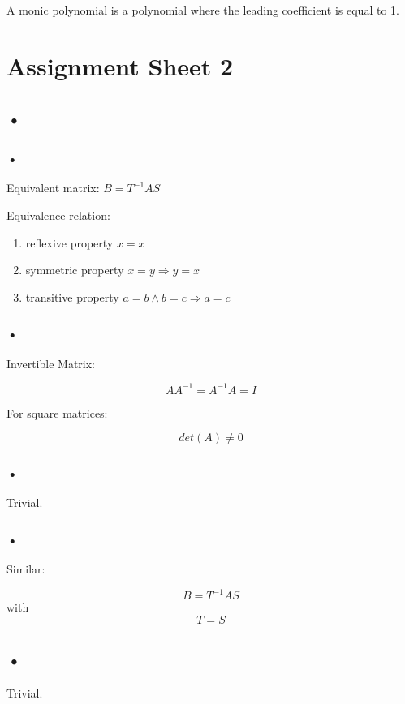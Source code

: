 \documentclass{report}
\begin{document}
\section{}

\subsection{}
A monic polynomial is a polynomial where the leading coefficient is equal to 1.
\subsection{}


\chapter{Assignment Sheet 2}
\section{•}
\subsection{•}
Equivalent matrix:
$B=T^{-1}AS$

Equivalence relation:
\begin{enumerate}
\item reflexive property $x=x$
\item symmetric property $x=y \Rightarrow y=x$
\item transitive property $a=b \land b=c \Rightarrow a=c$
\end{enumerate}
\subsection{•}
Invertible Matrix:

$$AA^{-1}=A^{-1}A=I$$

For square matrices:

$$det(A) \neq 0$$
\subsection{•}
Trivial.
\subsection{•}
Similar:

$$B=T^{-1}AS$$ with $$T=S$$

\section{•}
Trivial.
\end{document}
